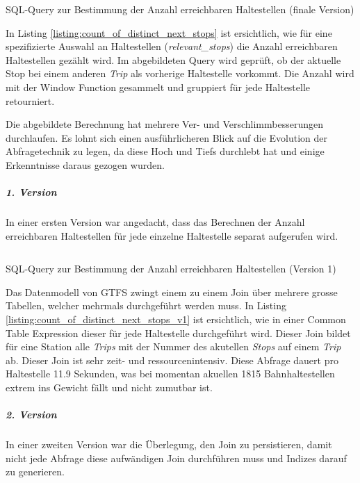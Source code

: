 \begin{listing}[ht]
    \inputminted{sql}{projectdoc/listing/count_of_distinct_next_stops.sql}
    \caption{SQL-Query zur Bestimmung der Anzahl erreichbaren Haltestellen (finale Version)}
    \label{listing:count_of_distinct_next_stops}
\end{listing}

In Listing \ref{listing:count_of_distinct_next_stops} ist ersichtlich, wie für eine spezifizierte Auswahl an Haltestellen (\emph{relevant\_stops}) die Anzahl erreichbaren Haltestellen gezählt wird.
Im abgebildeten Query wird geprüft, ob der aktuelle Stop bei einem anderen \emph{Trip} als vorherige Haltestelle vorkommt.
Die Anzahl wird mit der Window Function gesammelt und gruppiert für jede Haltestelle retourniert.

Die abgebildete Berechnung hat mehrere Ver- und Verschlimmbesserungen durchlaufen.
Es lohnt sich einen ausführlicheren Blick auf die Evolution der Abfragetechnik zu legen, da diese Hoch und Tiefs durchlebt hat und einige Erkenntnisse daraus gezogen wurden.

\subparagraph{1. Version}
In einer ersten Version war angedacht, dass das Berechnen der Anzahl erreichbaren Haltestellen für jede einzelne Haltestelle separat aufgerufen wird.

\begin{listing}[ht]
    \inputminted{sql}{projectdoc/listing/count_of_distinct_next_stops_v1.sql}
    \caption{SQL-Query zur Bestimmung der Anzahl erreichbaren Haltestellen (Version 1)}
    \label{listing:count_of_distinct_next_stops_v1}
\end{listing}

Das Datenmodell von GTFS zwingt einem zu einem Join über mehrere grosse Tabellen, welcher mehrmals durchgeführt werden muss.
In Listing \ref{listing:count_of_distinct_next_stops_v1} ist ersichtlich, wie in einer Common Table Expression dieser für jede Haltestelle durchgeführt wird.
Dieser Join bildet für eine Station alle \emph{Trips} mit der Nummer des akutellen \emph{Stops} auf einem \emph{Trip} ab.
Dieser Join ist sehr zeit- und ressourcenintensiv.
Diese Abfrage dauert pro Haltestelle 11.9 Sekunden, was bei momentan akuellen 1815 Bahnhaltestellen extrem ins Gewicht fällt und nicht zumutbar ist.

\subparagraph{2. Version}
In einer zweiten Version war die Überlegung, den Join zu persistieren, damit nicht jede Abfrage diese aufwändigen Join durchführen muss und Indizes darauf zu generieren.


